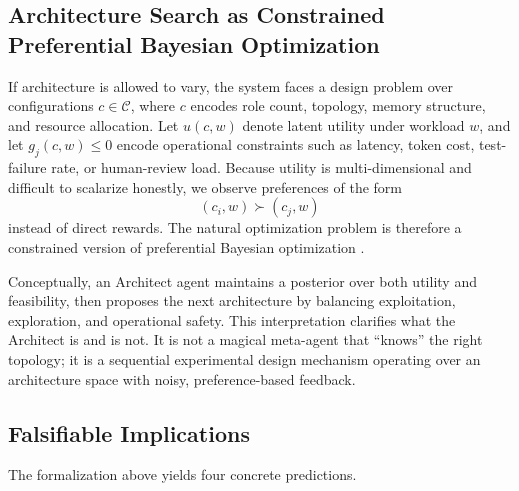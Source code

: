
\subsection{Architecture Search as Constrained Preferential Bayesian Optimization}

If architecture is allowed to vary, the system faces a design problem over configurations $c \in \mathcal{C}$, where $c$ encodes role count, topology, memory structure, and resource allocation. Let $u(c,w)$ denote latent utility under workload $w$, and let $g_j(c,w) \leq 0$ encode operational constraints such as latency, token cost, test-failure rate, or human-review load. Because utility is multi-dimensional and difficult to scalarize honestly, we observe preferences of the form
\begin{equation}
(c_i,w) \succ (c_j,w)
\end{equation}
instead of direct rewards. The natural optimization problem is therefore a constrained version of preferential Bayesian optimization \cite{gonzalez2017,brochu2010}.

Conceptually, an Architect agent maintains a posterior over both utility and feasibility, then proposes the next architecture by balancing exploitation, exploration, and operational safety. This interpretation clarifies what the Architect is and is not. It is not a magical meta-agent that ``knows'' the right topology; it is a sequential experimental design mechanism operating over an architecture space with noisy, preference-based feedback.


\subsection{Falsifiable Implications}

The formalization above yields four concrete predictions.

